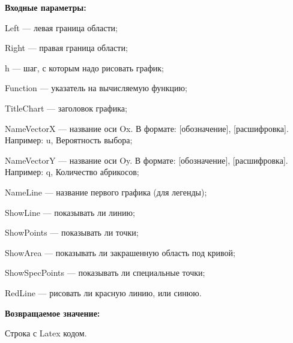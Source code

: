 \textbf{Входные параметры:}
 
Left --- левая граница области;
 
Right --- правая граница области;
 
h --- шаг, с которым надо рисовать график;
 
Function --- указатель на вычисляемую функцию;
 
TitleChart --- заголовок графика;
 
NameVectorX --- название оси Ox. В формате: [обозначение], [расшифровка]. Например: u, Вероятность выбора;
 
NameVectorY --- название оси Oy. В формате: [обозначение], [расшифровка]. Например: q, Количество абрикосов;
 
NameLine --- название первого графика (для легенды);
 
ShowLine --- показывать ли линию;
 
ShowPoints --- показывать ли точки;
 
ShowArea --- показывать ли закрашенную область под кривой;
 
ShowSpecPoints --- показывать ли специальные точки;
 
RedLine --- рисовать ли красную линию, или синюю.

\textbf{Возвращаемое значение:}

Строка с Latex кодом.